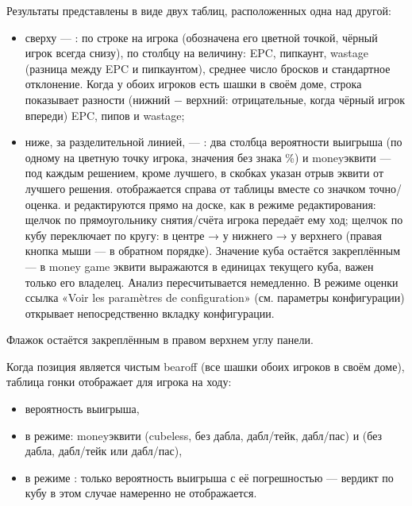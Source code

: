 \documentclass[letterpaper,10pt,russian]{sphinxmanual}
\begin{document}
\sphinxAtStartPar
Результаты представлены в виде двух таблиц, расположенных одна над другой:
\begin{itemize}
\item {} 
\sphinxAtStartPar
сверху — : по строке на игрока (обозначена его цветной точкой, чёрный игрок всегда снизу), по столбцу на величину: EPC, пипкаунт, wastage (разница между EPC и пипкаунтом), среднее число бросков и стандартное отклонение. Когда у обоих игроков есть шашки в своём доме, строка  показывает  разности (нижний − верхний: отрицательные, когда чёрный игрок впереди) EPC, пипов и wastage;

\item {} 
\sphinxAtStartPar
ниже, за разделительной линией, — : два столбца вероятности выигрыша (по одному на цветную точку игрока, значения без знака \%) и money\sphinxhyphen{}эквити — под каждым решением, кроме лучшего, в скобках указан отрыв эквити от лучшего решения.  отображается справа от таблицы вместе со значком точно/оценка.  и  редактируются прямо на доске, как в режиме редактирования: щелчок по прямоугольнику снятия/счёта игрока передаёт ему ход; щелчок по кубу переключает по кругу: в центре → у нижнего → у верхнего (правая кнопка мыши — в обратном порядке). Значение куба остаётся закреплённым — в money game эквити выражаются в единицах текущего куба, важен только его владелец. Анализ пересчитывается немедленно. В режиме оценки ссылка «Voir les paramètres de configuration» (см. параметры конфигурации) открывает непосредственно вкладку  конфигурации.

\end{itemize}

\sphinxAtStartPar
Флажок  остаётся закреплённым в правом верхнем углу панели.

\sphinxAtStartPar
Когда позиция является чистым bearoff (все шашки обоих игроков в своём доме), таблица гонки отображает для игрока на ходу:
\begin{itemize}
\item {} 
\sphinxAtStartPar
вероятность выигрыша,

\item {} 
\sphinxAtStartPar
в  режиме: money\sphinxhyphen{}эквити (cubeless, без дабла, дабл/тейк, дабл/пас) и  (без дабла, дабл/тейк или дабл/пас),

\item {} 
\sphinxAtStartPar
в режиме : только вероятность выигрыша с её погрешностью — вердикт по кубу в этом случае намеренно не отображается.

\end{itemize}
\end{document}
